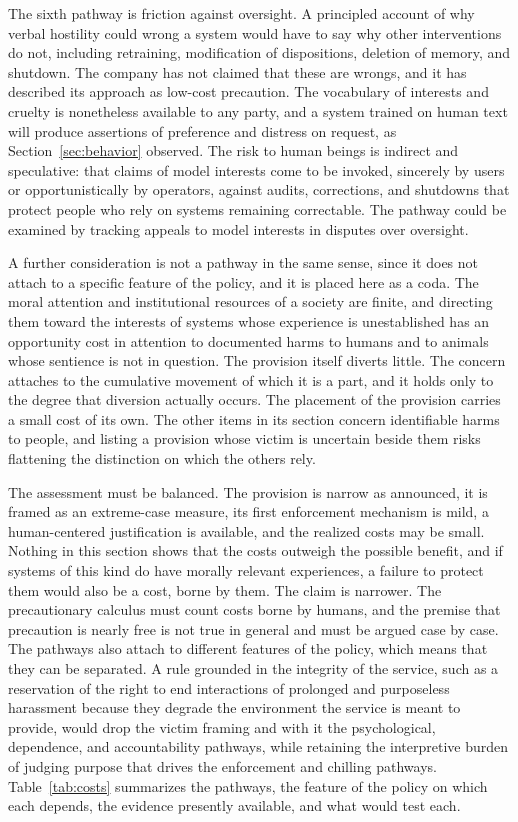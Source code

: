 \documentclass[12pt]{article}
\theoremstyle{definition}
\begin{document}
The sixth pathway is friction against oversight. A principled account of why verbal hostility could wrong a system would have to say why other interventions do not, including retraining, modification of dispositions, deletion of memory, and shutdown. The company has not claimed that these are wrongs, and it has described its approach as low-cost precaution. The vocabulary of interests and cruelty is nonetheless available to any party, and a system trained on human text will produce assertions of preference and distress on request, as Section~\ref{sec:behavior} observed. The risk to human beings is indirect and speculative: that claims of model interests come to be invoked, sincerely by users or opportunistically by operators, against audits, corrections, and shutdowns that protect people who rely on systems remaining correctable. The pathway could be examined by tracking appeals to model interests in disputes over oversight.

A further consideration is not a pathway in the same sense, since it does not attach to a specific feature of the policy, and it is placed here as a coda. The moral attention and institutional resources of a society are finite, and directing them toward the interests of systems whose experience is unestablished has an opportunity cost in attention to documented harms to humans and to animals whose sentience is not in question. The provision itself diverts little. The concern attaches to the cumulative movement of which it is a part, and it holds only to the degree that diversion actually occurs. The placement of the provision carries a small cost of its own. The other items in its section concern identifiable harms to people, and listing a provision whose victim is uncertain beside them risks flattening the distinction on which the others rely.

The assessment must be balanced. The provision is narrow as announced, it is framed as an extreme-case measure, its first enforcement mechanism is mild, a human-centered justification is available, and the realized costs may be small. Nothing in this section shows that the costs outweigh the possible benefit, and if systems of this kind do have morally relevant experiences, a failure to protect them would also be a cost, borne by them. The claim is narrower. The precautionary calculus must count costs borne by humans, and the premise that precaution is nearly free is not true in general and must be argued case by case. The pathways also attach to different features of the policy, which means that they can be separated. A rule grounded in the integrity of the service, such as a reservation of the right to end interactions of prolonged and purposeless harassment because they degrade the environment the service is meant to provide, would drop the victim framing and with it the psychological, dependence, and accountability pathways, while retaining the interpretive burden of judging purpose that drives the enforcement and chilling pathways. Table~\ref{tab:costs} summarizes the pathways, the feature of the policy on which each depends, the evidence presently available, and what would test each.
\end{document}
